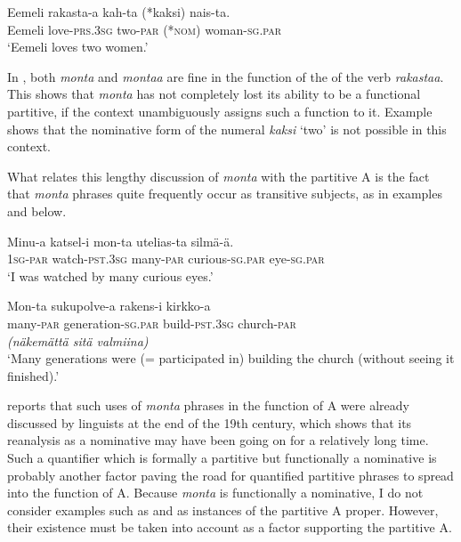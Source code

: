 \documentclass[output=paper]{LSP/langsci}
\begin{document}
\ea\label{15-hu-ex:57}
\gll Eemeli rakasta-a kah-ta (*kaksi) nais-ta.\\
Eemeli love-\textsc{prs}.\textsc{3sg} two-\textsc{par} (*\textsc{nom}) woman-\textsc{sg}.\textsc{par}\\
\glt ‘Eemeli loves two women.’
\z


In , both \textit{monta} and \textit{montaa} are fine in the function of the  of the  verb \textit{rakastaa}. This shows that \textit{monta} has not completely lost its ability to be a functional partitive, if the context unambiguously assigns such a function to it. Example  shows that the nominative form of the numeral \textit{kaksi} ‘two’ is not possible in this context. 

What relates this lengthy discussion of \textit{monta} with the partitive A is the fact that \textit{monta} phrases quite frequently occur as transitive subjects, as in examples  and  below. 

\ea\label{15-hu-ex:58}
\gll Minu-a katsel-i mon-ta utelias-ta silmä-ä.\\
\textsc{1sg}-\textsc{par} watch-\textsc{pst}.\textsc{3sg} many-\textsc{par} curious-\textsc{sg}.\textsc{par} eye-\textsc{sg}.\textsc{par}\\
\glt ‘I was watched by many curious eyes.’ %
\z

\ea\label{15-hu-ex:59}
\gll Mon-ta sukupolve-a rakens-i kirkko-a\\
many-\textsc{par} generation-\textsc{sg}.\textsc{par} build-\textsc{pst}.\textsc{3sg} church-\textsc{par}\\

\emph{(näkemättä sitä valmiina)}\\
\glt `Many generations were (= participated in) building the church (without seeing it finished).’ %
\z

\citet{Branch2001Montaa} reports that such uses of \textit{monta} phrases in the function of A were already discussed by linguists at the end of the 19th century, which shows that its reanalysis as a nominative may have been going on for a relatively long time. Such a quantifier which is formally a partitive but functionally a nominative is probably another factor paving the road for quantified partitive phrases to spread into the function of A. Because \textit{monta} is functionally a nominative, I do not consider examples such as  and  as instances of the partitive A proper. However, their existence must be taken into account as a factor supporting the partitive A. 
\end{document}
